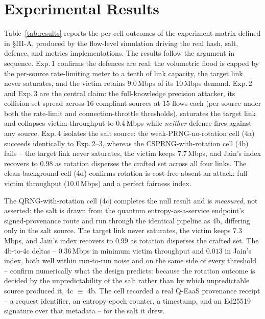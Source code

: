 \documentclass[conference]{IEEEtran}
\begin{document}
\section{Experimental Results}
\label{sec:results}

Table~\ref{tab:results} reports the per-cell outcomes of the experiment matrix defined in \S III-A, produced by
the flow-level simulation driving the real hash, salt, defence, and metrics implementations. The results follow
the argument in sequence. Exp.\,1 confirms the defences are real: the volumetric flood is capped by the
per-source rate-limiting meter to a tenth of link capacity, the target link never saturates, and the victim
retains $9.0$\,Mbps of its $10$\,Mbps demand. Exp.\,2 and Exp.\,3 are the central claim: the full-knowledge
precision attacker, its collision set spread across $16$ compliant sources at $15$ flows each (per source under
both the rate-limit and connection-throttle thresholds), saturates the target link and collapses victim
throughput to $0.4$\,Mbps while \emph{neither} defence fires against any source. Exp.\,4 isolates the salt
source: the weak-PRNG-no-rotation cell (4a) succeeds identically to Exp.\,2--3, whereas the CSPRNG-with-rotation
cell (4b) fails -- the target link never saturates, the victim keeps $7.7$\,Mbps, and Jain's index recovers to
$0.98$ as rotation disperses the crafted set across all four links. The clean-background cell (4d) confirms
rotation is cost-free absent an attack: full victim throughput ($10.0$\,Mbps) and a perfect fairness index.

The QRNG-with-rotation cell (4c) completes the null result and is \emph{measured}, not asserted: the salt is
drawn from the quantum entropy-as-a-service endpoint's signed-provenance route and run through the identical
pipeline as 4b, differing only in the salt source. The target link never saturates, the victim keeps
$7.3$\,Mbps, and Jain's index recovers to $0.99$ as rotation disperses the crafted set. The 4b-to-4c deltas --
$0.36$\,Mbps in minimum victim throughput and $0.013$ in Jain's index, both well within run-to-run noise and on
the same side of every threshold -- confirm numerically what the design predicts: because the rotation outcome
is decided by the unpredictability of the salt rather than by which unpredictable source produced it, 4c
$\equiv$ 4b. The cell recorded a real Q-EaaS provenance receipt -- a request identifier, an entropy-epoch
counter, a timestamp, and an Ed25519 signature over that metadata -- for the salt it drew.
\end{document}
